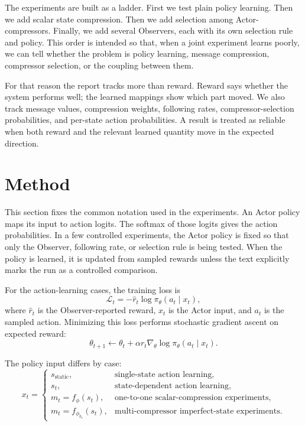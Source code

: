 \documentclass[11pt]{article}
\begin{document}
The experiments are built as a ladder. First we test plain policy learning.
Then we add scalar state compression. Then we add selection among
Actor-compressors. Finally, we add several Observers, each with its own
selection rule and policy. This order is intended so that, when a joint
experiment learns poorly, we can tell whether the problem is policy learning, message
compression, compressor selection, or the coupling between them.

For that reason the report tracks more than reward. Reward says whether the
system performs well; the learned mappings show which part moved. We also track
message values, compression weights, following rates,
compressor-selection probabilities, and per-state action probabilities. A
result is treated as reliable when both reward and the relevant learned
quantity move in the expected direction.

\section{Method}

This section fixes the common notation used in the experiments. An Actor policy
maps its input to action logits. The softmax of those logits gives the action
probabilities. In a few controlled experiments, the Actor policy is fixed so that
only the Observer, following rate, or selection rule is being tested. When the
policy is learned, it is updated from sampled rewards unless the text explicitly
marks the run as a controlled comparison.

For the action-learning cases, the training loss is
\[
  \mathcal{L}_t
  =
  -\hat r_t \log \pi_\theta(a_t \mid x_t),
\]
where \(\hat r_t\) is the Observer-reported reward, \(x_t\) is the Actor input,
and \(a_t\) is the sampled action. Minimizing this loss performs stochastic
gradient ascent on expected reward:
\[
  \theta_{t+1}
  \leftarrow
  \theta_t
  +
  \alpha r_t \nabla_\theta \log \pi_\theta(a_t \mid x_t).
\]

The policy input differs by case:
\[
  x_t =
  \begin{cases}
    s_{\mathrm{static}}, & \text{single-state action learning},\\
    s_t, & \text{state-dependent action learning},\\
    m_t=f_\phi(s_t), & \text{one-to-one scalar-compression experiments},\\
    m_t=f_{\phi_{k_t}}(s_t), & \text{multi-compressor imperfect-state experiments}.
  \end{cases}
\]
\end{document}
